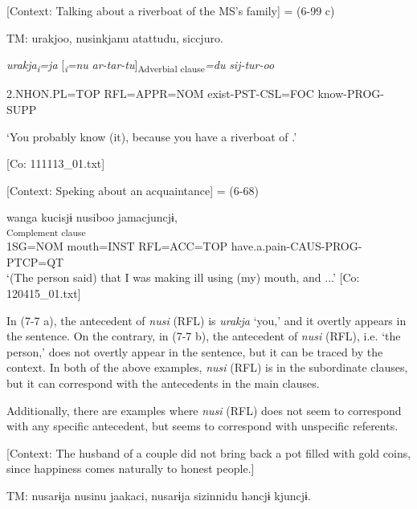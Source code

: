 \ea \label{ex:7:7}  
\ea\label{ex:7:7a}  [Context: Talking about a riverboat of the MS’s family] = (6-99 c)

    TM:  urakjoo,  nusinkjanu  atattudu,   siccjuro.

      \textit{urakja\textsubscript{i}}\textit{=ja}  [\textit{\textsubscript{i}}\textit{=nu}  \textit{ar-tar-tu}]\textsubscript{Adverbial clause}\textit{=du}  \textit{sij-tur-oo}
                                                                                                                                                                      
      2.NHON.PL=TOP  RFL=APPR=NOM  exist-PST-CSL=FOC   know-PROG-SUPP

      ‘You probably know (it), because you have a riverboat of .’

      [Co: 111113\_01.txt]

  \ex\label{ex:7:7b}  [Context: Speking about an acquaintance] = (6-68)

\glll  wanga  kucisjɨ  nusiboo  jamacjuncjɨ,\\
[\textit{wan=ga}  \textit{kuci=sjɨ}  \textit{\Highlight{nusi}=ba=ja}  \textit{jam-as-tur-n=ccjɨ}]\textsubscript{Complement clause}\\
1SG=NOM  mouth=INST  RFL=ACC=TOP  have.a.pain-CAUS-PROG-PTCP=QT\\
\glt ‘(The person said) that I was making \textit{\textsubscript{} }ill using (my) mouth, and ...’ [Co: 120415\_01.txt]
\z
\z

In (7-7 a), the antecedent of \textit{nusi} (RFL) is \textit{urakja} ‘you,’ and it overtly appears in the sentence. On the contrary, in (7-7 b), the antecedent of \textit{nusi} (RFL), i.e. ‘the person,’ does not overtly appear in the sentence, but it can be traced by the context. In both of the above examples, \textit{nusi} (RFL) is in the subordinate clauses, but it can correspond with the antecedents in the main clauses.

  Additionally, there are examples where \textit{nusi} (RFL) does not seem to correspond with any specific antecedent, but seems to correspond with unspecific referents.

\ea \label{ex:7:8}  [Context: The husband of a couple did not bring back a pot filled with gold coins, since happiness comes naturally to honest people.]

  TM:  nusarɨja  nusinu  jaakaci,  nusarɨja  sizinnidu   həncjɨ  kjuncjɨ.

